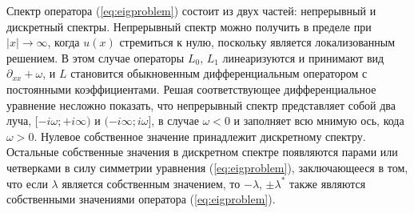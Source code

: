 Спектр оператора (\ref{eq:eigproblem}) состоит из двух частей: непрерывный и дискретный спектры.
Непрерывный спектр можно получить в пределе при $|x| \to \infty$, когда $u(x)$ стремиться к нулю, поскольку является локализованным решением.
В этом случае операторы $L_0$, $L_1$ линеаризуются и принимают вид $\partial_{xx} + \omega$, и $L$ становится обыкновенным дифференциальным оператором с постоянными коэффициентами.
Решая соответствующее дифференциальное уравнение несложно показать, что непрерывный спектр представляет собой два луча, $[-i \omega; +i \infty)$ и $( -i \infty; i \omega]$, в случае $\omega < 0$ и заполняет всю мнимую ось, кода $\omega > 0$.
Нулевое собственное значение принадлежит дискретному спектру.
Остальные собственные значения в дискретном спектре появляются парами или четверками в силу симметрии уравнения (\ref{eq:eigproblem}), заключающееся в том, что если $\lambda$ является собственным значением, то $-\lambda$, $\pm \lambda^*$ также являются собственными значениями оператора (\ref{eq:eigproblem}).

